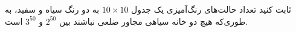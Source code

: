     ثابت کنید تعداد حالت‌های رنگ‌آمیزی یک جدول $10\times10$ به دو رنگ سیاه و سفید، به طوری‌که هیچ دو خانه سیاهی مجاور ضلعی نباشند بین $2^{50}$ و $3^{50}$ است.
